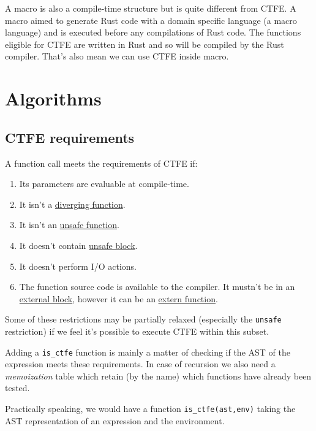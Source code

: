 \documentclass[a4paper,11pt]{article}
\begin{document}
A macro is also a compile-time structure but is quite different from CTFE. A macro aimed to generate Rust code with a domain specific language (a macro language) and is executed before any compilations of Rust code. The functions eligible for CTFE are written in Rust and so will be compiled by the Rust compiler. That's also mean we can use CTFE inside macro.

\section{Algorithms}

\subsection{CTFE requirements}
\label{ctfe-requirements}

A function call meets the requirements of CTFE if:

\begin{enumerate}
\item Its parameters are evaluable at compile-time.
\item It isn't a \href{http://static.rust-lang.org/doc/master/rust.html#diverging-functions}{diverging function}.
\item It isn't an \href{http://static.rust-lang.org/doc/master/rust.html#unsafe-functions}{unsafe function}.
\item It doesn't contain \href{http://static.rust-lang.org/doc/master/rust.html#unsafe-blocks}{unsafe block}.
\item It doesn't perform I/O actions.
\item The function source code is available to the compiler. It mustn't be in an \href{http://static.rust-lang.org/doc/master/rust.html#external-blocks}{external block}, however it can be an \href{http://static.rust-lang.org/doc/master/rust.html#extern-functions}{extern function}.
\end{enumerate}

Some of these restrictions may be partially relaxed (especially the \lstinline{unsafe} restriction) if we feel it's possible to execute CTFE within this subset.

Adding a \lstinline{is_ctfe} function is mainly a matter of checking if the AST of the expression meets these requirements. In case of recursion we also need a \textit{memoization} table which retain (by the name) which functions have already been tested.

Practically speaking, we would have a function \lstinline{is_ctfe(ast,env)} taking the AST representation of an expression and the environment.
\end{document}
